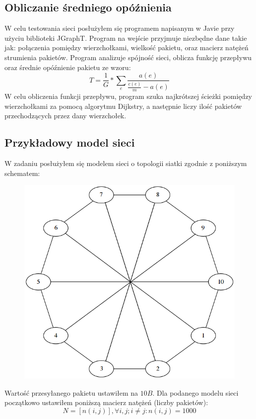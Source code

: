 \documentclass[titlepage]{article}
\begin{document}
\subsection{Obliczanie średniego opóźnienia}
W celu testowania sieci posłużyłem się programem napisanym w Javie przy użyciu biblioteki JGraphT. Program na wejście przyjmuje niezbędne dane takie jak: połączenia pomiędzy wierzchołkami, wielkość pakietu, oraz macierz natężeń strumienia pakietów. Program analizuje spójność sieci, oblicza funkcję przepływu oraz średnie opóźnienie pakietu ze wzoru:
\begin{equation*}
	T = \frac{1}{G} * \sum_e{\frac{a(e)}{\frac{c(e)}{m}-a(e)}}
\end{equation*}
W celu obliczenia funkcji przepływu, program szuka najkrótszej ścieżki pomiędzy wierzchołkami za pomocą algorytmu Dijkstry, a następnie liczy ilość pakietów przechodzących przez dany wierzchołek.


\subsection{Przykładowy model sieci}
W zadaniu posłużyłem się modelem sieci o topologii siatki zgodnie z poniższym schematem:
\begin{figure}[h!]
	\centering
	\includegraphics[width=0.8\linewidth]{graph5.png}
\end{figure}

Wartość przesyłanego pakietu ustawiłem na $10B$.
Dla podanego modelu sieci początkowo ustawiłem poniższą macierz natężeń (liczby pakietów):
\begin{equation*}
	N = [n(i,j)], \forall i,j; i \neq j: n(i,j)=1000
\end{equation*}
\end{document}
